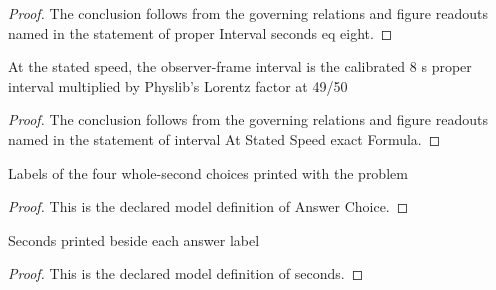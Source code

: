 \begin{proof}
  The conclusion follows from the governing relations and figure readouts named in the statement of proper Interval seconds eq eight.
\end{proof}
\begin{lemma}
  \label{lem:physics:phyx-mini-0599:phyxminiproblems-problemphyxmini0599-intervalatstatedspeed-exactformula}
  At the stated speed, the observer-frame interval is the calibrated 8 s proper interval multiplied by Physlib's Lorentz factor at 49/50
\end{lemma}
\begin{proof}
  The conclusion follows from the governing relations and figure readouts named in the statement of interval At Stated Speed exact Formula.
\end{proof}
\begin{definition}
  \label{def:physics:phyx-mini-0599:phyxminiproblems-problemphyxmini0599-answerchoice}
  Labels of the four whole-second choices printed with the problem
\end{definition}
\begin{proof}
  This is the declared model definition of Answer Choice.
\end{proof}
\begin{definition}[seconds]
  \label{def:physics:phyx-mini-0599:phyxminiproblems-problemphyxmini0599-answerchoice-seconds}
  Seconds printed beside each answer label
\end{definition}
\begin{proof}
  This is the declared model definition of seconds.
\end{proof}
